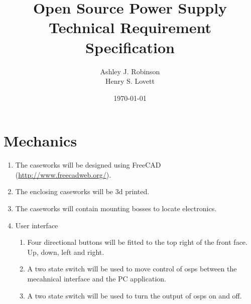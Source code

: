 \documentclass[12pt,a4paper]{article}
\title{Open Source Power Supply\\ Technical Requirement Specification}
\author{Ashley J. Robinson \\ Henry S. Lovett}
\date{\today}
\begin{document}
\maketitle



\section{Mechanics}
\begin{enumerate}[label*=\arabic*.]
\item The caseworks will be designed using FreeCAD (\url{http://www.freecadweb.org/}).
\item The enclosing caseworks will be \gls{3d} printed.
\item The caseworks will contain mounting bosses to locate electronics.
\item User interface
	\begin{enumerate}[label*=\arabic*.]
	\item Four directional buttons will be fitted to the top right of the front face. Up, down, left and right.
	\item A two state switch will be used to move control of \gls{osps} between the mecahnical interface and the PC application.
	\item A two state switch will be used to turn the output of \gls{osps} on and off.
	\end{enumerate}
\end{enumerate}
\end{document}
